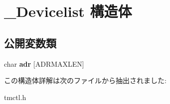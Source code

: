 \hypertarget{struct___devicelist}{}\section{\+\_\+\+Devicelist 構造体}
\label{struct___devicelist}
\subsection*{公開変数類}
\begin{DoxyCompactItemize}
\item 
\mbox{\label{struct___devicelist_a9a7c1d6e49926f29e7b0d45717c7891c}} 
char {\bfseries adr} \mbox{[}A\+D\+R\+M\+A\+X\+L\+EN\mbox{]}
\end{DoxyCompactItemize}


この構造体詳解は次のファイルから抽出されました\+:\begin{DoxyCompactItemize}
\item 
tmctl.\+h\end{DoxyCompactItemize}
